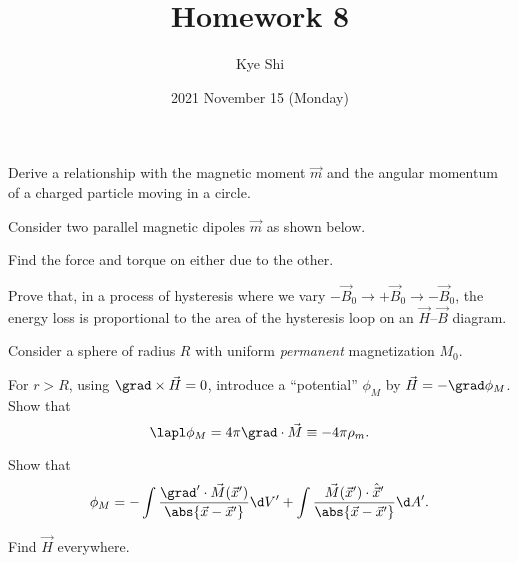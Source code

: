 \documentclass{phys151}
\title{Homework 8}
\date{2021 November 15 (Monday)}
\author{Kye Shi}
\begin{document}
\begin{problem}
  Derive a relationship with the magnetic moment \(\vec m\) and the angular
  momentum of a charged particle moving in a circle.
\end{problem}

\begin{solution}

\end{solution}

\begin{problem}
  Consider two parallel magnetic dipoles \(\vec m\) as shown below.
  \begin{center}
  \end{center}
  Find the force and torque on either due to the other.
\end{problem}

\begin{solution}

\end{solution}

\begin{problem}
  Prove that, in a process of hysteresis where we vary \(-\vec B_0 \to +\vec
  B_0 \to -\vec B_0\), the energy loss is proportional to the area of the
  hysteresis loop on an \(\vec H\)--\(\vec B\) diagram.
\end{problem}

\begin{solution}

\end{solution}

\begin{problem}
  Consider a sphere of radius \(R\) with uniform \emph{permanent} magnetization
  \(M_0\).
  \begin{subproblems}
    \item For \(r>R\), using \(\grad\times\vec H=0\), introduce a ``potential''
      \(\phi_M\) by \(\vec H=-\grad\phi_M\).  Show that
      \[
        \lapl \phi_M = 4\pi \grad\cdot\vec M \equiv -4\pi\rho_m.
      \]
    \item Show that
      \[
        \phi_M
        = -\int \frac{\grad' \cdot \vec M(\vec x')} {\abs{\vec x-\vec x'}} \d V'
        + \int \frac {\vec M(\vec x') \cdot \hat{\vec x}'} {\abs{\vec x-\vec x'}} \d A'.
      \]
    \item Find \(\vec H\) everywhere.
  \end{subproblems}
\end{problem}

\begin{solution}

\end{solution}
\end{document}
